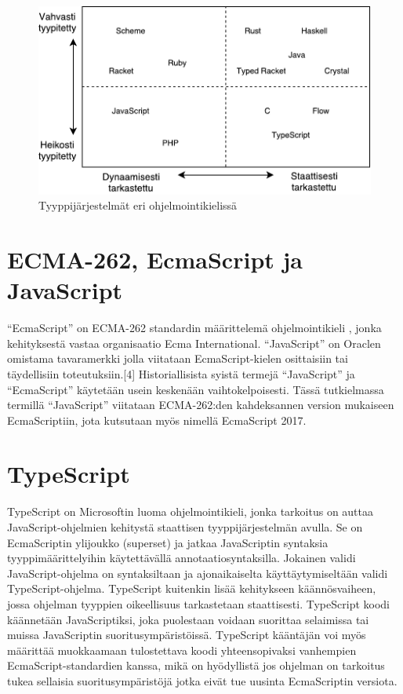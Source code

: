 \begin{figure}
\centering
\includegraphics{images/type-systems.pdf}
\caption{Tyyppijärjestelmät eri ohjelmointikielissä}
\end{figure}

\section{ECMA-262, EcmaScript ja JavaScript}
``EcmaScript'' on ECMA-262 standardin määrittelemä ohjelmointikieli
\cite{JavaScriptLanguageResources, Ecma262}, jonka kehityksestä vastaa
organisaatio Ecma International. ``JavaScript'' on Oraclen omistama
tavaramerkki jolla viitataan EcmaScript-kielen osittaisiin tai täydellisiin
toteutuksiin.[4] Historiallisista syistä termejä
``JavaScript'' ja ``EcmaScript'' käytetään usein keskenään vaihtokelpoisesti.
Tässä tutkielmassa termillä ``JavaScript'' viitataan ECMA-262:den kahdeksannen
version mukaiseen EcmaScriptiin, jota kutsutaan myös nimellä EcmaScript 2017.

\section{TypeScript}
TypeScript on Microsoftin luoma ohjelmointikieli, jonka tarkoitus on
auttaa JavaScript-ohjelmien kehitystä staattisen tyyppijärjestelmän avulla.
Se on EcmaScriptin ylijoukko (superset) \cite{TypeScriptSpec} ja jatkaa
JavaScriptin syntaksia tyyppimäärittelyihin käytettävällä
annotaatiosyntaksilla. Jokainen validi JavaScript-ohjelma on syntaksiltaan ja
ajonaikaiselta käyttäytymiseltään validi TypeScript-ohjelma. TypeScript
kuitenkin lisää kehitykseen käännösvaiheen, jossa ohjelman tyyppien
oikeellisuus tarkastetaan staattisesti. TypeScript koodi käännetään
JavaScriptiksi, joka puolestaan voidaan suorittaa selaimissa tai muissa
JavaScriptin suoritusympäristöissä. TypeScript kääntäjän voi myös määrittää
muokkaamaan tulostettava koodi yhteensopivaksi vanhempien
EcmaScript-standardien kanssa, mikä on hyödyllistä jos ohjelman on tarkoitus
tukea sellaisia suoritusympäristöjä jotka eivät tue uusinta EcmaScriptin
versiota.

